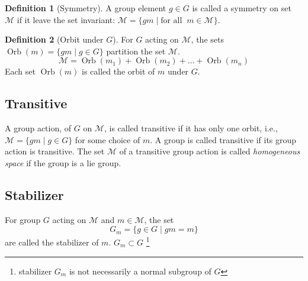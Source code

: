 \documentclass{amsart}
\newcommand{\setM}{\mathcal{M}}
\theoremstyle{remark}
\theoremstyle{remark}
\theoremstyle{definition}
\newtheorem*{definition}{Definition}
\DeclareMathOperator{\Orb}{Orb}
\begin{document}
\begin{definition}
    [Symmetry]
    A group element $g\in G$ is called a symmetry on set $\setM$ if it leave the set invariant:
    $\setM = \{gm \mid \text{for all }\ m \in \setM\}$. 
\end{definition}

\vspace{10pt}

\begin{definition}
    [Orbit under $G$]
    For $G$ acting on $\setM$, the sets $\Orb(m) = \{gm\mid g\in G\}$ partition the set $\setM$. 
    \[\setM = \Orb(m_1) + \Orb(m_2) + \dots + \Orb(m_n)\]
    Each set $\Orb(m)$ is called the orbit of $m$ under $G$.
\end{definition}

\subsection*{Transitive}
A group action, of $G$ on $\setM$, is called transitive if it has only one orbit, i.e., 
$\setM = \{gm \mid g \in G\}$ for some choice of $m$. A group is called transitive if 
its group action is transitive. 
The set $\setM$ of a transitive group action is called \emph{homogeneous space} if the group 
is a lie group.

\subsection*{Stabilizer}
For group $G$ acting on $\setM$ and $m \in \setM$, the set 
\[G_m = \{ g\in G\mid gm = m \}\]
are called the stabilizer of $m$. $G_m \subset G$
\footnote{stabilizer $G_m$ is not necessarily a normal subgroup of $G$}
\end{document}
